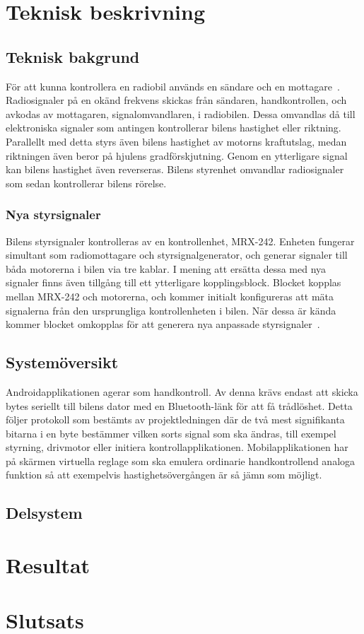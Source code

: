 \documentclass[a4paper]{article}
\begin{document}
\section{Teknisk beskrivning}

\subsection{Teknisk bakgrund}
För att kunna kontrollera en radiobil används en sändare och en mottagare~\cite{RCTechnique}. Radiosignaler på en okänd frekvens skickas från sändaren, handkontrollen, och avkodas av mottagaren, signalomvandlaren, i radiobilen. Dessa omvandlas då till elektroniska signaler som antingen kontrollerar bilens hastighet eller riktning. Parallellt med detta styrs även bilens hastighet av motorns kraftutslag, medan riktningen även beror på hjulens gradförskjutning. Genom en ytterligare signal kan bilens hastighet även reverseras. Bilens styrenhet omvandlar radiosignaler som sedan kontrollerar bilens rörelse.

\subsubsection{Nya styrsignaler}
Bilens styrsignaler kontrolleras av en kontrollenhet, MRX-242. Enheten fungerar simultant som radiomottagare och styrsignalgenerator, och generar signaler till båda motorerna i bilen via tre kablar. I mening att ersätta dessa med nya signaler finns även tillgång till ett ytterligare kopplingsblock. Blocket kopplas mellan MRX-242 och motorerna, och kommer initialt konfigureras att mäta signalerna från den ursprungliga kontrollenheten i bilen. När dessa är kända kommer blocket omkopplas för att generera nya anpassade styrsignaler~\cite{projektDir}. 


\subsection{Systemöversikt}
Androidapplikationen agerar som handkontroll. Av denna krävs endast att skicka bytes seriellt till bilens dator med en Bluetooth-länk för att få trådlöshet. Detta följer protokoll som bestämts av projektledningen där de två mest signifikanta bitarna i en byte bestämmer vilken sorts signal som ska ändras, till exempel styrning, drivmotor eller initiera kontrollapplikationen. Mobilapplikationen har på skärmen virtuella reglage som ska emulera ordinarie handkontrollend analoga funktion så att exempelvis hastighetsövergången är så jämn som möjligt.


\subsection{Delsystem}




\section{Resultat}




\section{Slutsats}



\newpage


\end{document}
